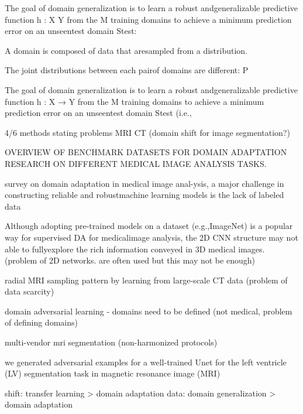         The goal of domain generalization is to learn a robust andgeneralizable predictive function h : X  Y from the M training domains to achieve a minimum prediction error on an unseentest domain Stest:

        A domain is composed of data that aresampled from a distribution.

        The joint distributions between each pairof domains are different: P

        The goal of domain generalization is to learn a robust andgeneralizable predictive function h : X → Y from the M training
        domains to achieve a minimum prediction error on an unseentest domain Stest (i.e.,






        \citep{yang2024generalized}



        4/6 methods stating problems MRI CT (domain shift for image segmentation?)

        OVERVIEW OF BENCHMARK DATASETS FOR DOMAIN ADAPTATION RESEARCH ON DIFFERENT MEDICAL IMAGE ANALYSIS TASKS. \citep{guan2021domain}

        \citep{guan2021domain} survey on domain adaptation
        in medical image anal-ysis, a major challenge in constructing reliable and robustmachine learning models is the lack of labeled data \citep{guan2021domain}

        Although adopting pre-trained models on a dataset (e.g.,ImageNet) is a popular way for supervised DA for medicalimage analysis, the 2D CNN structure may not able to fullyexplore the rich information conveyed in 3D medical images. \citep{guan2021domain} (problem of 2D networks. are often used but this may not be enough)

        \citep{han2018deep} radial MRI sampling pattern by learning from large-scale CT data (problem of data scarcity)

        \citep{ganin2016domain} domain adversarial learning - domains need to be defined (not medical, problem of defining domains)

        \citep{yan2019edge} multi-vendor mri segmentation (non-harmonized protocols)

        \citep{yan2019domain} we generated adversarial
        examples for a well-trained Unet for the left ventricle (LV) segmentation task in
        magnetic resonance image (MRI)

        \citep{yan2019domain} shift: transfer learning > domain adaptation
        data: domain generalization > domain adaptation




